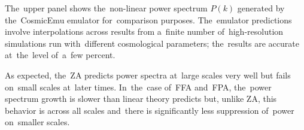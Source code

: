 The~upper panel shows the~non-linear power spectrum $P(k)$ generated by the~CosmicEmu emulator \parencite{Heitmann:2015xma} for~comparison purposes. The~emulator predictions involve interpolations across results from a~finite number of~high-resolution simulations run with~different cosmological parameters; the~results are accurate at~the~level of~a~few percent.

As expected, the~ZA predicts power spectra at~large scales very well but fails on~small scales at~later times. In~the~case of~FFA and~FPA, the~power spectrum growth is slower than linear theory predicts but, unlike ZA, this behavior is across all scales and~there is significantly less suppression of~power on~smaller scales.